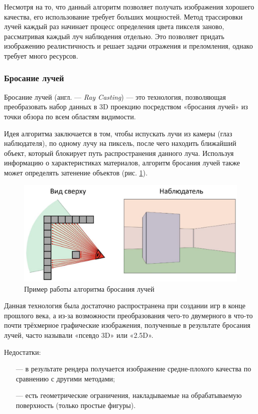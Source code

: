 Несмотря на то, что данный алгоритм позволяет получать изображения 
хорошего качества, его использование требует больших мощностей.
Метод 
трассировки лучей каждый раз начинает процесс определения цвета пикселя 
заново, рассматривая каждый луч наблюдения отдельно.
Это позволяет придать 
изображению реалистичность и решает задачи отражения и преломления, 
однако требует много ресурсов.

\subsubsection{Бросание лучей}

Бросание лучей (англ. --- \textit{Ray Casting}) \cite{raycasting} --- это технология, позволяющая 
преобразовать набор данных в 3D проекцию посредством «бросания лучей» из 
точки обзора по всем областям видимости.

Идея алгоритма заключается в том, чтобы испускать лучи из камеры (глаз 
наблюдателя), по одному лучу на пиксель, после чего находить ближайший 
объект, который блокирует путь распространения данного луча.
Используя информацию о характеристиках материалов, алгоритм бросания лучей также может определять затенение объектов (рис. \ref{fig:raycasting}).

\begin{figure}[h]
	\centering
	\captionsetup{justification=centering}
	\includegraphics[width=120mm]{img/raycasting.png}
	\caption{Пример работы алгоритма бросания лучей}
	\label{fig:raycasting}
\end{figure}

Данная технология была достаточно распространена при создании игр в 
конце прошлого века, а из-за возможности преобразования чего-то двумерного 
в что-то почти трёхмерное графические изображения, полученные в результате 
бросания лучей, часто называли «псевдо 3D» или «2.5D».

Недостатки:
\begin{itemize}[leftmargin=1.6\parindent]
	\item[---] в результате рендера получается изображение средне-плохого качества по сравнению с другими методами;
	\item[---] есть геометрические ограничения, накладываемые на обрабатываемую поверхность (только простые фигуры).
\end{itemize}

